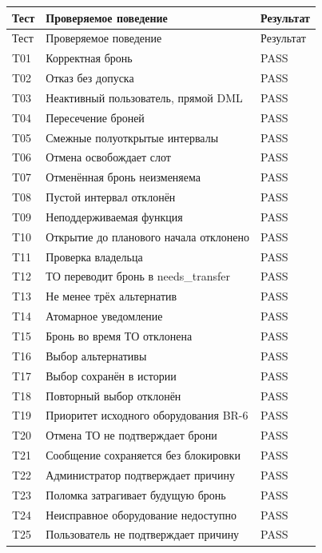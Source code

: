 \begin{singlespace}\small
\begin{longtable}{>{\raggedright\arraybackslash}p{}>{\raggedright\arraybackslash}p{}>{\raggedright\arraybackslash}p{}}
\toprule Тест & Проверяемое поведение & Результат\\\midrule\endfirsthead
\toprule Тест & Проверяемое поведение & Результат\\\midrule\endhead
T01 & Корректная бронь & PASS \\
T02 & Отказ без допуска & PASS \\
T03 & Неактивный пользователь, прямой DML & PASS \\
T04 & Пересечение броней & PASS \\
T05 & Смежные полуоткрытые интервалы & PASS \\
T06 & Отмена освобождает слот & PASS \\
T07 & Отменённая бронь неизменяема & PASS \\
T08 & Пустой интервал отклонён & PASS \\
T09 & Неподдерживаемая функция & PASS \\
T10 & Открытие до планового начала отклонено & PASS \\
T11 & Проверка владельца & PASS \\
T12 & ТО переводит бронь в needs\_\allowbreak{}transfer & PASS \\
T13 & Не менее трёх альтернатив & PASS \\
T14 & Атомарное уведомление & PASS \\
T15 & Бронь во время ТО отклонена & PASS \\
T16 & Выбор альтернативы & PASS \\
T17 & Выбор сохранён в истории & PASS \\
T18 & Повторный выбор отклонён & PASS \\
T19 & Приоритет исходного оборудования BR-6 & PASS \\
T20 & Отмена ТО не подтверждает брони & PASS \\
T21 & Сообщение сохраняется без блокировки & PASS \\
T22 & Администратор подтверждает причину & PASS \\
T23 & Поломка затрагивает будущую бронь & PASS \\
T24 & Неисправное оборудование недоступно & PASS \\
T25 & Пользователь не подтверждает причину & PASS \\

\end{longtable}
\end{singlespace}
